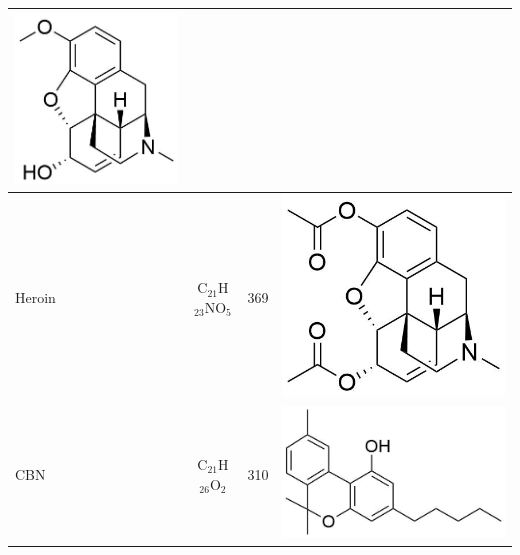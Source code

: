 \begin{table}
\begin{tabular}{lccc}
\begin{minipage}[c]{0.3\linewidth}
\includegraphics[height=0.12\textheight]{pics/other_drugs/codeine_struct.png}\end{minipage}\\ \midrule
Heroin & C$_{21}$H$_{23}$NO$_5$ & 369 &  
\begin{minipage}[c]{0.3\linewidth}\centering
\includegraphics[height=0.12\textheight]{pics/other_drugs/heroin_struct.png}\end{minipage}\\ \midrule
CBN & C$_{21}$H$_{26}$O$_2$ & 310 &  
\begin{minipage}[c]{0.3\linewidth}\centering
\includegraphics[height=0.1\textheight]{pics/other_drugs/CBN_struct.png}\end{minipage}\\ \midrule

\end{tabular}
\end{table}
